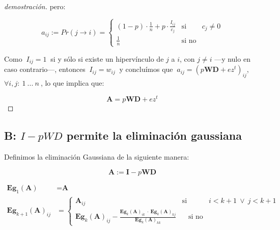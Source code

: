 \begin{proof}[demostración]
\noindent pero: 
\vspace{1em}

\begin{equation*}
    a_{ij} := Pr(j \longrightarrow i) = \left\{ 
                                            \begin{array}{lcc}
                                            (1 - p)\cdot \frac{1}{n} + p \cdot \frac{I_{ij}}{c_j}      &  \text{si}    & c_j \neq 0\\
                                            \frac{1}{n}                                                &  \text{si no}  &
                                            \end{array}
                                        \right.
\end{equation*}
\vspace{1em}

Como $\ I_{ij} = 1\ $ si y sólo si existe un hipervínculo de $j$ a $i$, con $j \neq i$ ---y nulo en caso contrario---, entonces $\ I_{ij} = w_{ij}\ $ y concluímos que $\ a_{ij} = (p\textbf{W}\textbf{D} + ez^t)_{ij}$, $\forall i, j:\ 1\ ...\ n\ $,  lo que implica que:
\vspace{1em}

\begin{equation*}
    \textbf{A} = p\textbf{W}\textbf{D} + ez^t
\end{equation*}
\vspace{1em}

\end{proof}



\subsection{B: $I - pWD$ permite la eliminación gaussiana}\label{A.2}

Definimos la eliminación Gaussiana de la siguiente manera:

\begin{equation*}
\textbf{A} := \textbf{I} - p\textbf{WD}
\end{equation*}

\begin{align*}
    \textbf{Eg}_{1}(\textbf{A}) \ \ \  &=   \textbf{A}
                            \\
    \textbf{Eg}_{k+1}(\textbf{A})_{ij}  &=  \left\{ 
                                    \begin{array}{lcc}
                                    \textbf{A}_{ij}   &   \text{si}    & i < k+1 \ \vee \  j < k+1 \\
                                    \textbf{Eg}_{k}(\textbf{A})_{ij} - \frac {\textbf{Eg}_{k}(\textbf{A})_{ik} \ \cdot \ \textbf{Eg}_{k}(\textbf{A})_{kj}}{\textbf{Eg}_{k}(\textbf{A})_{kk}}    &  \ \ \ \  \text{si no} &
                                    \end{array}
                                \right.\
\end{align*}


